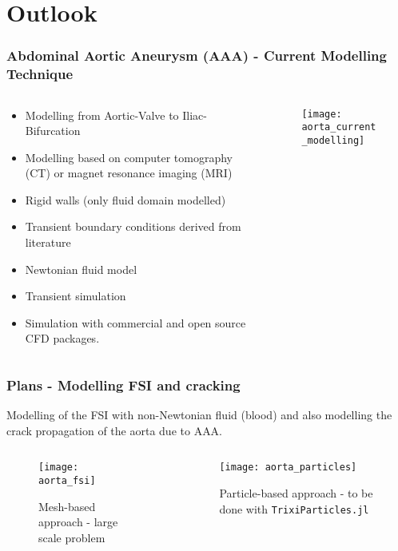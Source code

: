 \section{Outlook}

\begin{frame}
    \frametitle{Abdominal Aortic Aneurysm (AAA) - Current Modelling Technique}
    \begin{columns}[onlytextwidth]
        \begin{column}{0.5\textwidth}
            \begin{itemize}
                \item Modelling from Aortic-Valve to Iliac-Bifurcation
                \item Modelling based on computer tomography (CT) or magnet resonance
                      imaging (MRI)
                \item Rigid walls (only fluid domain modelled)
                \item Transient boundary conditions derived from literature
                \item Newtonian fluid model
                \item Transient simulation
                \item Simulation with commercial and open source CFD packages.
            \end{itemize}
        \end{column}
        \begin{column}{0.5\textwidth}
            \begin{figure}[ht]
                \centering
                \texttt{[image: aorta\_current\_modelling]}
            \end{figure}
        \end{column}
    \end{columns}
\end{frame}
\begin{frame}
    \frametitle{Plans - Modelling FSI and cracking}
    Modelling of the FSI with non-Newtonian fluid (blood) and also modelling the crack
    propagation of the aorta due to AAA.
    \begin{columns}[onlytextwidth]
        \begin{column}{0.5\textwidth}
            \begin{figure}[ht]
                \centering
                \texttt{[image: aorta\_fsi]}
                \caption{Mesh-based approach - large scale problem}
            \end{figure}
        \end{column}
        \begin{column}{0.5\textwidth}
            \begin{figure}[ht]
                \centering
                \texttt{[image: aorta\_particles]}
                \caption{Particle-based approach - to be done with
                    \texttt{TrixiParticles.jl}}
            \end{figure}
        \end{column}
    \end{columns}
\end{frame}
